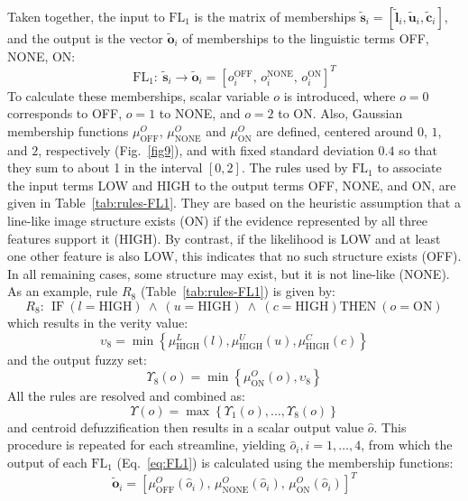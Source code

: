 \begin{figure}[!t]
	\label{fig8}
\end{figure}

Taken together, the input to $\textrm{FL}_{1}$ is the matrix of memberships $\tilde{\mathbf{s}}_{i}=[\tilde{\mathbf{l}}_{i},\tilde{\mathbf{u}}_{i},\tilde{\mathbf{c}}_{i}]$, and the output is the vector $\tilde{\mathbf{o}}_{i}$ of memberships to the linguistic terms OFF, NONE, ON:
\begin{equation}
\mathrm{FL}_{1}\!:\ \tilde{\mathbf{s}}_{i} \rightarrow \tilde{\mathbf{o}}_{i} = \left[o_{i}^{\textrm{OFF}}\!,\, o_{i}^{\textrm{NONE}}\!,\, o_{i}^{\textrm{ON}}\right]^T
\label{eq:FL1}
\end{equation}
To calculate these memberships, scalar variable $o$ is introduced, where $o=0$ corresponds to OFF, $o=1$ to NONE, and $o=2$ to ON. Also, Gaussian membership functions $\mu_{\textrm{OFF}}^{O}$, $\mu_{\textrm{NONE}}^{O}$ and $\mu_{\textrm{ON}}^{O}$  are defined, centered around $0$, $1$, and $2$, respectively (Fig.~\ref{fig9}), and with fixed standard deviation $0.4$ so that they sum to about 1 in the interval $[0,2]$. The rules used by $\textrm{FL}_{1}$ to associate the input terms LOW and HIGH to the output terms OFF, NONE, and ON, are given in Table~\ref{tab:rules-FL1}. They are based on the heuristic assumption that a line-like image structure exists (ON) if the evidence represented by all three features support it (HIGH). By contrast, if the likelihood is LOW and at least one other feature is also LOW, this indicates that no such structure exists (OFF). In all remaining cases, some structure may exist, but it is not line-like (NONE). As an example, rule $R_8$ (Table~\ref{tab:rules-FL1}) is given by:
\begin{equation}
R_8\!:\ \ \textrm{IF}\ (l=\textrm{HIGH})\ \wedge\ (u=\textrm{HIGH})\ \wedge\ (c=\textrm{HIGH}) \textrm{THEN}\ (o = \textrm{ON})
\end{equation}
which results in the verity value:
\begin{equation}
\upsilon_{8} = \min\left\{\mu_{\textrm{HIGH}}^{L}(l), \mu_{\textrm{HIGH}}^{U}(u), \mu_{\textrm{HIGH}}^{C}(c)\right\}
\end{equation}
and the output fuzzy set: 
\begin{equation}
\Upsilon_{8}(o) = \min\left\{\mu_{\textrm{ON}}^{O}(o),\upsilon_{8}\right\}
\end{equation}
All the rules are resolved and combined as:
\begin{equation}
\Upsilon(o) = \max\left\{\Upsilon_{1}(o),\dots,\Upsilon_{8}(o)\right\}
\end{equation}
and centroid defuzzification then results in a scalar output value $\hat{o}$. This procedure is repeated for each streamline, yielding $\hat{o}_{i}, i=1,\dots,4$, from which the output of each $\mathrm{FL}_{1}$ (Eq.~\ref{eq:FL1}) is calculated using the membership functions:
\begin{equation}
\tilde{\mathbf{o}}_{i} = \left[\mu_{\textrm{OFF}}^{O}(\hat{o}_{i}),\, \mu_{\textrm{NONE}}^{O}(\hat{o}_{i}),\, \mu_{\textrm{ON}}^{O}(\hat{o}_{i})\right]^{T}
\end{equation}

